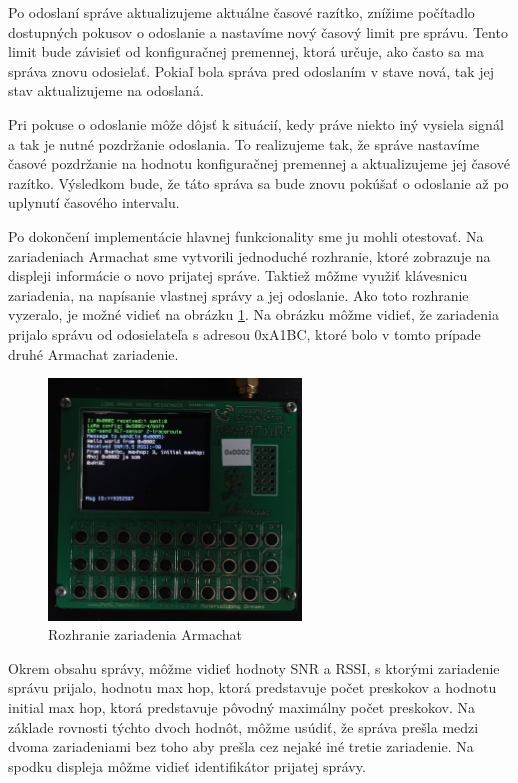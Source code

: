 \documentclass[slovak,master]{diploma}
\begin{document}
Po odoslaní správe aktualizujeme aktuálne časové razítko, znížime počítadlo dostupných pokusov o odoslanie a nastavíme nový časový limit pre správu. Tento 
limit bude závisieť od konfiguračnej premennej, ktorá určuje, ako často sa ma správa znovu odosielať. Pokiaľ bola správa pred odoslaním v stave nová, tak jej stav aktualizujeme 
na odoslaná.

Pri pokuse o odoslanie môže dôjsť k situácií, kedy práve niekto iný vysiela signál a tak je nutné pozdržanie odoslania. To realizujeme tak, že správe nastavíme 
časové pozdržanie na hodnotu konfiguračnej premennej a aktualizujeme jej časové razítko. Výsledkom bude, že táto správa sa bude znovu pokúšať o odoslanie až po uplynutí 
časového intervalu.

Po dokončení implementácie hlavnej funkcionality sme ju mohli otestovať. Na zariadeniach Armachat sme vytvorili jednoduché rozhranie, 
ktoré zobrazuje na displeji informácie o novo prijatej správe. Taktiež môžme využiť klávesnicu zariadenia, na napísanie vlastnej správy a jej odoslanie.
Ako toto rozhranie vyzeralo, je možné vidieť na obrázku \ref{fig:armRec}.
Na obrázku môžme vidieť, že zariadenia prijalo správu od odosielateľa s adresou 0xA1BC, ktoré bolo v tomto prípade druhé Armachat zariadenie.

\begin{figure}
	\centering
	\includegraphics[width=0.6\textwidth]{Figures/armRec.jpg}
	\caption{Rozhranie zariadenia Armachat}
	\label{fig:armRec}
\end{figure}
\newpage
Okrem obsahu správy, môžme vidieť hodnoty SNR a RSSI, s ktorými zariadenie správu prijalo, hodnotu max hop, ktorá predstavuje počet preskokov a hodnotu initial max hop, 
ktorá predstavuje pôvodný maximálny počet preskokov. Na základe rovnosti týchto dvoch hodnôt, môžme usúdiť, že správa prešla medzi dvoma zariadeniami bez toho aby prešla 
cez nejaké iné tretie zariadenie. Na spodku displeja môžme vidieť identifikátor prijatej správy.
\end{document}
